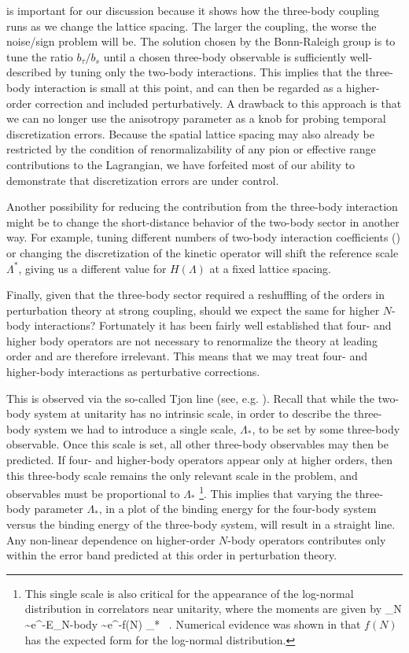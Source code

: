  is important for our discussion because it shows how the three-body coupling runs as we change the lattice spacing. The larger the coupling, the worse the noise/sign problem will be. The solution chosen by the Bonn-Raleigh group is to tune the ratio $b_{\tau}/b_s$ until a chosen three-body observable is sufficiently well-described by tuning only the two-body interactions. This implies that the three-body interaction is small at this point, and can then be regarded as a higher-order correction and included perturbatively. A drawback to this approach is that we can no longer use the anisotropy parameter as a knob for probing temporal discretization errors. Because the spatial lattice spacing may also already be restricted by the condition of renormalizability of any pion or effective range contributions to the Lagrangian, we have forfeited most of our ability to demonstrate that discretization errors are under control.

Another possibility for reducing the contribution from the three-body interaction might be to change the short-distance behavior of the two-body sector in another way. For example, tuning different numbers of two-body interaction coefficients () or changing the discretization of the kinetic operator will shift the reference scale $\Lambda^*$, giving us a different value for $H(\Lambda)$ at a fixed lattice spacing.

Finally, given that the three-body sector required a reshuffling of the orders in perturbation theory at strong coupling, should we expect the same for higher $N$-body interactions? Fortunately it has been fairly well established that four- and higher body operators are not necessary to renormalize the theory at leading order and are therefore irrelevant. This means that we may treat four- and higher-body interactions as perturbative corrections.

This is observed via the so-called Tjon line (see, e.g. \cite{Hammer:2010kp}). Recall that while the two-body system at unitarity has no intrinsic scale, in order to describe the three-body system we had to introduce a single scale, $\Lambda_{*}$, to be set by some three-body observable. Once this scale is set, all other three-body observables may then be predicted. If four- and higher-body operators appear only at higher orders, then this three-body scale remains the only relevant scale in the problem, and observables must be proportional to $\Lambda_{*}$ \footnote{This single scale is also critical for the appearance of the log-normal distribution in correlators near unitarity, where the moments are given by
\beq
{}_N \sim e^{-E_{\mbox{\tiny N-body}}\tau} \sim e^{-f(N) \Lambda_{*} \tau} \ .
\eeq
Numerical evidence was shown in \cite{Nicholson:2012zp} that $f(N)$ has the expected form for the log-normal distribution.}. This implies that varying the three-body parameter $\Lambda_{*}$, in a plot of the binding energy for the four-body system versus the binding energy of the three-body system, will result in a straight line. Any non-linear dependence on higher-order $N$-body operators contributes only within the error band predicted at this order in perturbation theory.


